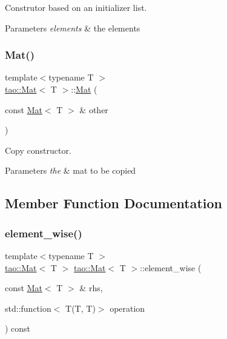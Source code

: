 Construtor based on an initializer list. 


\begin{DoxyParams}{Parameters}
{\em elements} & the elements \\
\hline
\end{DoxyParams}
\mbox{\label{classtao_1_1_mat_a74c591cbc3893506d9f97cf9f54e7adf}} 
\subsubsection{\texorpdfstring{Mat()}{Mat()}\hspace{0.1cm}{\footnotesize\ttfamily [5/5]}}
{\footnotesize\ttfamily template$<$typename T $>$ \\
\mbox{\hyperlink{classtao_1_1_mat}{tao\+::\+Mat}}$<$ T $>$\+::\mbox{\hyperlink{classtao_1_1_mat}{Mat}} (\begin{DoxyParamCaption}\item[{const \mbox{\hyperlink{classtao_1_1_mat}{Mat}}$<$ T $>$ \&}]{other }\end{DoxyParamCaption})}



Copy constructor. 


\begin{DoxyParams}{Parameters}
{\em the} & mat to be copied \\
\hline
\end{DoxyParams}


\subsection{Member Function Documentation}
\mbox{\label{classtao_1_1_mat_a6947500e8c7439144bcda888278944ff}} 
\subsubsection{\texorpdfstring{element\_wise()}{element\_wise()}}
{\footnotesize\ttfamily template$<$typename T $>$ \\
\mbox{\hyperlink{classtao_1_1_mat}{tao\+::\+Mat}}$<$ T $>$ \mbox{\hyperlink{classtao_1_1_mat}{tao\+::\+Mat}}$<$ T $>$\+::element\+\_\+wise (\begin{DoxyParamCaption}\item[{const \mbox{\hyperlink{classtao_1_1_mat}{Mat}}$<$ T $>$ \&}]{rhs,  }\item[{std\+::function$<$ T(T, T)$>$}]{operation }\end{DoxyParamCaption}) const}



